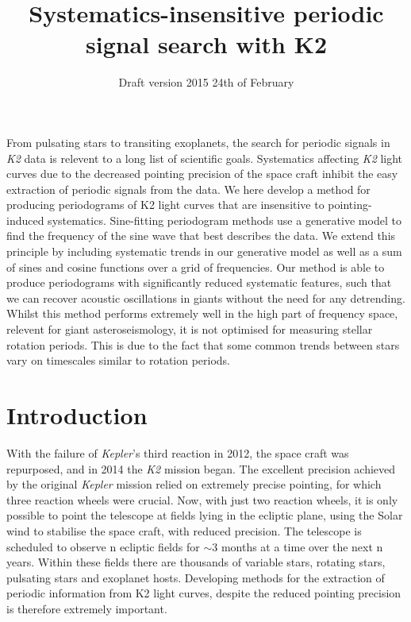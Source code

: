 \documentclass[useAMS, usenatbib]{aastex}
\title{Systematics-insensitive periodic signal search with K2}
\begin{document}
\date{Draft version 2015 24th of February}
\maketitle

From pulsating stars to transiting exoplanets, the search for periodic signals
in {\it K2} data is relevent to a long list of scientific goals.
Systematics affecting {\it K2} light curves due to the decreased pointing
precision of the space craft inhibit the easy extraction of periodic signals
from the data.
We here develop a method for producing periodograms of K2 light curves that
are insensitive to pointing-induced systematics.
Sine-fitting periodogram methods use a generative model to find the frequency
of the sine wave that best describes the data.
We extend this principle by including systematic trends in our generative
model as well as a sum of sines and cosine functions over a grid of
frequencies.
Our method is able to produce periodograms with significantly reduced
systematic features, such that we can recover acoustic oscillations in giants
without the need for any detrending.
Whilst this method performs extremely well in the high part of frequency space,
relevent for giant asteroseismology, it is not optimised for measuring stellar
rotation periods.
This is due to the fact that some common trends between stars vary on
timescales similar to rotation periods.

\section{Introduction}
\label{Introduction}

With the failure of {\it Kepler}'s third reaction in 2012, the space craft was
repurposed, and in 2014 the {\it K2} mission began.
The excellent precision achieved by the original {\it Kepler} mission relied on extremely precise pointing, for which three reaction wheels were crucial.
Now, with just two reaction wheels, it is only possible to point the telescope
at fields lying in the ecliptic plane, using the Solar wind to stabilise
the space craft, with reduced precision.
The telescope is scheduled to observe n ecliptic fields for $\sim$3 months at a
time over the next n years.
Within these fields there are thousands of variable stars, rotating stars,
pulsating stars and exoplanet hosts.
Developing methods for the extraction of periodic information from K2 light
curves, despite the reduced pointing precision is therefore extremely
important.
\end{document}
